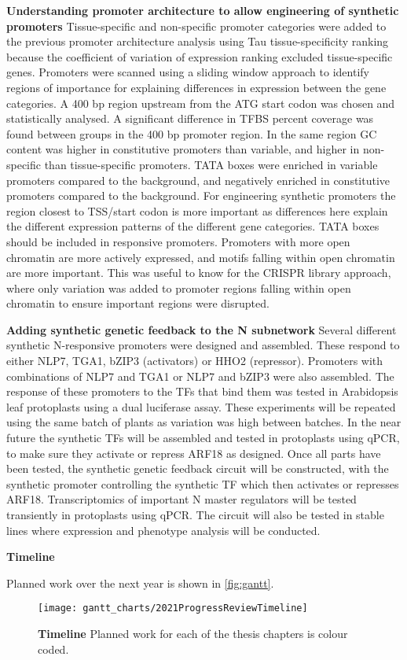 \documentclass[../main.tex]{subfiles}
\begin{document}
\textbf{Understanding promoter architecture to allow engineering of synthetic promoters}
Tissue-specific and non-specific promoter categories were added to the previous promoter architecture analysis using Tau tissue-specificity ranking because the coefficient of variation of expression ranking excluded tissue-specific genes. Promoters were scanned using a sliding window approach to identify regions of importance for explaining differences in expression between the gene categories. A 400 bp region upstream from the ATG start codon was chosen and statistically analysed. A significant difference in TFBS percent coverage was found between groups in the 400 bp promoter region. In the same region GC content was higher in constitutive promoters than variable, and higher in non-specific than tissue-specific promoters. TATA boxes were enriched in variable promoters compared to the background, and negatively enriched in constitutive promoters compared to the background.
For engineering synthetic promoters the region closest to TSS/start codon is more important as differences here explain the different expression patterns of the different gene categories. TATA boxes should be included in responsive promoters. Promoters with more open chromatin are more actively expressed, and motifs falling within open chromatin are more important. This was useful to know for the CRISPR library approach, where only variation was added to promoter regions falling within open chromatin to ensure important regions were disrupted.

\textbf{Adding synthetic genetic feedback to the N subnetwork}
Several different synthetic N-responsive promoters were designed and assembled. These respond to either NLP7, TGA1, bZIP3 (activators) or HHO2 (repressor). Promoters with combinations of NLP7 and TGA1 or NLP7 and bZIP3 were also assembled. The response of these promoters to the TFs that bind them was tested in Arabidopsis leaf protoplasts using a dual luciferase assay. These experiments will be repeated using the same batch of plants as variation was high between batches. In the near future the synthetic TFs will be assembled and tested in protoplasts using qPCR, to make sure they activate or repress ARF18 as designed. Once all parts have been tested, the synthetic genetic feedback circuit will be constructed, with the synthetic promoter controlling the synthetic TF which then activates or represses ARF18. Transcriptomics of important N master regulators will be tested transiently in protoplasts using qPCR. The circuit will also be tested in stable lines where expression and phenotype analysis will be conducted.

\textbf{Timeline}

Planned work over the next year is shown in \autoref{fig:gantt}.
\begin{sidewaysfigure}[hbt!]
	\begin{center}
		\capstart
		\texttt{[image: gantt\_charts/2021ProgressReviewTimeline]}
		\caption{
			\textbf{Timeline}
			Planned work for each of the thesis chapters is colour coded.            
			\label{fig:gantt}
		}
	\end{center}
\end{sidewaysfigure}
\end{document}
